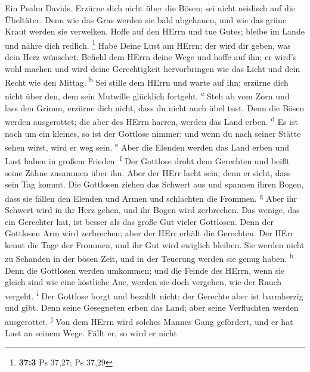  Ein Psalm Davids. Erzürne dich nicht über die Bösen; sei
nicht neidisch auf die Übeltäter.  Denn wie das Gras
werden sie bald abgehauen, und wie das grüne Kraut werden sie verwelken.
 Hoffe auf den HErrn und tue Gutes; bleibe im Lande und
nähre dich redlich. \footnote{\textbf{37:3} Ps 37,27; Ps 37,29}
 Habe Deine Lust am HErrn; der wird dir geben, was dein
Herz wünschet.  Befiehl dem HErrn deine Wege und hoffe auf
ihn; er wird's wohl machen  und wird deine Gerechtigkeit
hervorbringen wie das Licht und dein Recht wie den Mittag.
\textsuperscript{b}  Sei stille dem HErrn und warte auf
ihn; erzürne dich nicht über den, dem sein Mutwille glücklich fortgeht.
\textsuperscript{c}  Steh ab vom Zorn und lass den Grimm,
erzürne dich nicht, dass du nicht auch übel tust.  Denn
die Bösen werden ausgerottet; die aber des HErrn harren, werden das Land
erben. \textsuperscript{d}  Es ist noch um ein kleines,
so ist der Gottlose nimmer; und wenn du nach seiner Stätte sehen wirst,
wird er weg sein. \textsuperscript{e}  Aber die Elenden
werden das Land erben und Lust haben in großem Frieden.
\textsuperscript{f}  Der Gottlose droht dem Gerechten und
beißt seine Zähne zusammen über ihn.  Aber der HErr lacht
sein; denn er sieht, dass sein Tag kommt.  Die Gottlosen
ziehen das Schwert aus und spannen ihren Bogen, dass sie fällen den
Elenden und Armen und schlachten die Frommen. \textsuperscript{g}
 Aber ihr Schwert wird in ihr Herz gehen, und ihr Bogen
wird zerbrechen.  Das wenige, das ein Gerechter hat, ist
besser als das große Gut vieler Gottlosen.  Denn der
Gottlosen Arm wird zerbrechen; aber der HErr erhält die Gerechten.
 Der HErr kennt die Tage der Frommen, und ihr Gut wird
ewiglich bleiben.  Sie werden nicht zu Schanden in der
bösen Zeit, und in der Teuerung werden sie genug haben.
\textsuperscript{h}  Denn die Gottlosen werden umkommen;
und die Feinde des HErrn, wenn sie gleich sind wie eine köstliche Aue,
werden sie doch vergehen, wie der Rauch vergeht. \textsuperscript{i}
 Der Gottlose borgt und bezahlt nicht; der Gerechte aber
ist barmherzig und gibt.  Denn seine Gesegneten erben das
Land; aber seine Verfluchten werden ausgerottet. \textsuperscript{j}
 Von dem HErrn wird solches Mannes Gang gefördert, und er
hat Lust an seinem Wege.  Fällt er, so wird er nicht
